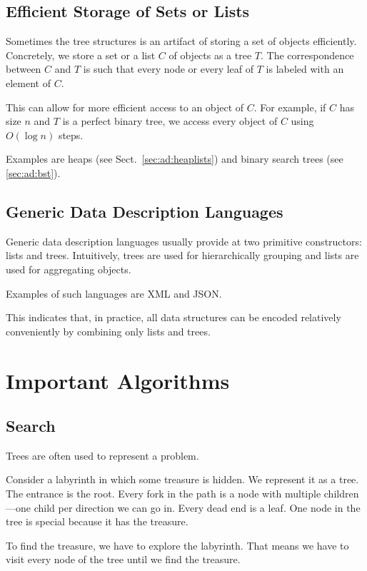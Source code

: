\subsection{Efficient Storage of Sets or Lists}

Sometimes the tree structures is an artifact of storing a set of objects efficiently.
Concretely, we store a set or a list $C$ of objects as a tree $T$.
The correspondence between $C$ and $T$ is such that every node or every leaf of $T$ is labeled with an element of $C$.

This can allow for more efficient access to an object of $C$.
For example, if $C$ has size $n$ and $T$ is a perfect binary tree, we access every object of $C$ using $O(\log n)$ steps.

Examples are heaps (see Sect.~\ref{sec:ad:heaplists}) and binary search trees (see \ref{sec:ad:bst}).

\subsection{Generic Data Description Languages}

Generic data description languages usually provide at two primitive constructors: lists and trees.
Intuitively, trees are used for hierarchically grouping and lists are used for aggregating objects.

Examples of such languages are XML and JSON.

This indicates that, in practice, all data structures can be encoded relatively conveniently by combining only lists and trees.

\section{Important Algorithms}

\subsection{Search}

Trees are often used to represent a problem.

\begin{example}
Consider a labyrinth in which some treasure is hidden.
We represent it as a tree.
The entrance is the root.
Every fork in the path is a node with multiple children---one child per direction we can go in.
Every dead end is a leaf.
One node in the tree is special because it has the treasure.

To find the treasure, we have to explore the labyrinth.
That means we have to visit every node of the tree until we find the treasure.
\end{example}

